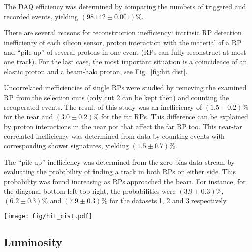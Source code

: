 \documentclass[doublecol]{../macros/epl2}
\def\un#1{\,{\rm #1}}
\begin{document}
The DAQ efficiency was determined by comparing the numbers of triggered and recorded events, yielding $(98.142 \pm 0.001)\%$.

There are several reasons for reconstruction inefficiency: intrinsic RP detection inefficiency of each silicon sensor, proton interaction with the material of a RP and ``pile-up'' of several protons in one event (RPs can fully reconstruct at most one track). For the last case, the most important situation is a coincidence of an elastic proton and a beam-halo proton, see Fig.~\ref{fig:hit dist}.

Uncorrelated inefficiencies of single RPs were studied by removing the examined RP from the selection cuts (only cut 2 can be kept then) and counting the recuperated events. The result of this study was an inefficiency of $(1.5 \pm 0.2)\%$ for the near and $(3.0 \pm 0.2)\%$ for the far RPs. This difference can be explained by proton interactions in the near pot that affect the far RP too. This near-far correlated inefficiency was determined from data by counting events with corresponding shower signatures, yielding $(1.5\pm 0.7)\%$.

The ``pile-up'' inefficiency was determined from the zero-bias data stream by evaluating the probability of finding a track in both RPs on either side. This probability was found increasing as RPs approached the beam. For instance, for the diagonal bottom-left top-right, the probabilities were $(3.9 \pm 0.3)\%$, $(6.2 \pm 0.3)\%$ and $(7.9 \pm 0.3)\%$ for the datasets 1, 2 and 3 respectively.


\begin{figure*}
\begin{center}
\texttt{[image: fig/hit\_dist.pdf]}
\vskip-5mm
\caption{Hit distributions from dataset 3 in the far unit of the $220\un{m}$ station, right arm. Left: with diagonal cut only, Right: with all the elastic selection cuts (see Tab.~\ref{cuts}). The left plot clearly indicates the presence of the beam halo, which is eliminated by the selection cuts (the right plot). The distribution of elastic hits in the right plot is sharply cut at about $|y| = 29\un{mm}$ which is a consequence of the LHC aperture limitations. }
\label{fig:hit dist}
\end{center}
\end{figure*}

\subsection{Luminosity}
\end{document}
